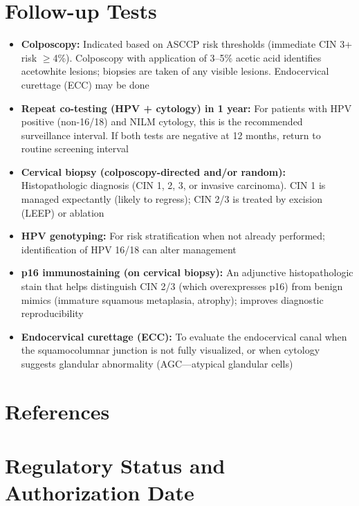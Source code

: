 \section*{Follow-up Tests}
\begin{itemize}
  \item \textbf{Colposcopy:} Indicated based on ASCCP risk thresholds (immediate CIN 3+ risk $\geq$4\%). Colposcopy with application of 3--5\% acetic acid identifies acetowhite lesions; biopsies are taken of any visible lesions. Endocervical curettage (ECC) may be done
  \item \textbf{Repeat co-testing (HPV + cytology) in 1 year:} For patients with HPV positive (non-16/18) and NILM cytology, this is the recommended surveillance interval. If both tests are negative at 12 months, return to routine screening interval
  \item \textbf{Cervical biopsy (colposcopy-directed and/or random):} Histopathologic diagnosis (CIN 1, 2, 3, or invasive carcinoma). CIN 1 is managed expectantly (likely to regress); CIN 2/3 is treated by excision (LEEP) or ablation
  \item \textbf{HPV genotyping:} For risk stratification when not already performed; identification of HPV 16/18 can alter management
  \item \textbf{p16 immunostaining (on cervical biopsy):} An adjunctive histopathologic stain that helps distinguish CIN 2/3 (which overexpresses p16) from benign mimics (immature squamous metaplasia, atrophy); improves diagnostic reproducibility
  \item \textbf{Endocervical curettage (ECC):} To evaluate the endocervical canal when the squamocolumnar junction is not fully visualized, or when cytology suggests glandular abnormality (AGC---atypical glandular cells)
\end{itemize}

\section*{References}



\clearpage
\section*{Regulatory Status and Authorization Date}

\clearpage
